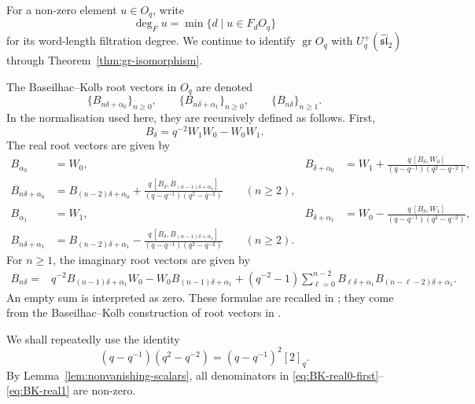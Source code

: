 \documentclass[11pt]{extarticle}
\theoremstyle{definition}
\theoremstyle{remark}
\numberwithin{equation}{section}
\newcommand{\Oq}{O_q}
\newcommand{\Uplus}{U_q^+(\widehat{\mathfrak{sl}}_2)}
\newcommand{\gr}{\operatorname{gr}}
\newcommand{\comm}[2]{[ #1,#2 ]}
\begin{document}
For a non-zero element \(u\in\Oq\), write
\[
        \deg_F u=\min\{d\mid u\in F_d\Oq\}
\]
for its word-length filtration degree.  We continue to identify
\(\gr\Oq\) with \(\Uplus\) through Theorem~\ref{thm:gr-isomorphism}.

The Baseilhac--Kolb root vectors in \(\Oq\) are denoted
\[
 \{B_{n\delta+\alpha_0}\}_{n\geq0},\qquad
 \{B_{n\delta+\alpha_1}\}_{n\geq0},\qquad
 \{B_{n\delta}\}_{n\geq1}.
\]
In the normalisation used here, they are recursively defined as follows.
First,
\begin{equation}
\label{eq:Bdelta}
        B_\delta=q^{-2}W_1W_0-W_0W_1 .
\end{equation}
The real root vectors are given by
\begin{align}
B_{\alpha_0}&=W_0,
&
B_{\delta+\alpha_0}
 &=W_1+
   \frac{q\,\comm{B_\delta}{W_0}}
        {(q-q^{-1})(q^2-q^{-2})},
\label{eq:BK-real0-first}\\
B_{n\delta+\alpha_0}
 &=B_{(n-2)\delta+\alpha_0}
   +\frac{q\,\comm{B_\delta}{B_{(n-1)\delta+\alpha_0}}}
        {(q-q^{-1})(q^2-q^{-2})}
        \qquad(n\geq2),
\label{eq:BK-real0}\\
B_{\alpha_1}&=W_1,
&
B_{\delta+\alpha_1}
 &=W_0-
   \frac{q\,\comm{B_\delta}{W_1}}
        {(q-q^{-1})(q^2-q^{-2})},
\label{eq:BK-real1-first}\\
B_{n\delta+\alpha_1}
 &=B_{(n-2)\delta+\alpha_1}
   -\frac{q\,\comm{B_\delta}{B_{(n-1)\delta+\alpha_1}}}
        {(q-q^{-1})(q^2-q^{-2})}
        \qquad(n\geq2).
\label{eq:BK-real1}
\end{align}
For \(n\geq1\), the imaginary root vectors are given by
\begin{align}
B_{n\delta}
={}&q^{-2}B_{(n-1)\delta+\alpha_1}W_0
    -W_0B_{(n-1)\delta+\alpha_1}+(q^{-2}-1)
  \sum_{\ell=0}^{n-2}
  B_{\ell\delta+\alpha_1}
  B_{(n-\ell-2)\delta+\alpha_1}.
\label{eq:BK-imaginary}
\end{align}
An empty sum is interpreted as zero.  These formulae are recalled in
\cite[Section~4, equations~(7)--(12)]{Terwilliger2022OqACE}; they come
from the Baseilhac--Kolb construction of root vectors in
\cite[Section~3]{BaseilhacKolb2020}.

We shall repeatedly use the identity
\begin{equation}
\label{eq:denominator-expanded}
 (q-q^{-1})(q^2-q^{-2})=(q-q^{-1})^2[2]_q .
\end{equation}
By Lemma~\ref{lem:nonvanishing-scalars}, all denominators in
\eqref{eq:BK-real0-first}--\eqref{eq:BK-real1} are non-zero.
\end{document}
